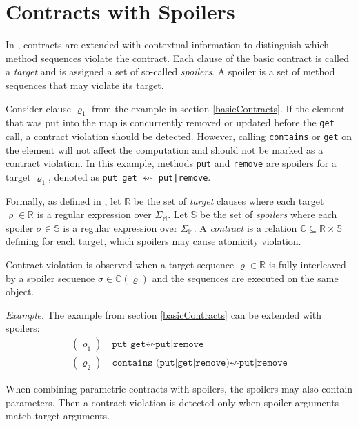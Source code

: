 \section{Contracts with Spoilers}
\label{contractsWithSpoilers}

In \cite{contracts}, contracts are extended with contextual information to
distinguish which method sequences violate the contract. Each clause of the
basic contract is called a \emph{target} and is assigned a set of so-called
\emph{spoilers}. A spoiler is a set of method sequences that may violate its
target.

Consider clause $\varrho_1$ from the example in section \ref{basicContracts}. If
the element that was put into the map is concurrently removed or updated before
the \texttt{get} call, a contract violation should be detected.  However,
calling \texttt{contains} or \texttt{get} on the element will not affect the
computation and should not be marked as a contract violation. In this example,
methods \texttt{put} and \texttt{remove} are spoilers for a target
$\varrho_1$, denoted as \texttt{put get} $\leftsquigarrow$ \texttt{put|remove}.


Formally, as defined in \cite{contracts}, let $\mathbb{R}$ be the set of
\emph{target} clauses where each target $\varrho \in \mathbb{R}$ is a regular
expression over $\Sigma_\mathbb{M}$. Let $\mathbb{S}$ be the set of
\emph{spoilers} where each spoiler $\sigma \in \mathbb{S}$ is a regular
expression over $\Sigma_\mathbb{M}$. A \emph{contract} is a relation $\mathbb{C}
\subseteq \mathbb{R} \times \mathbb{S}$ defining for each target, which spoilers
may cause atomicity violation.

Contract violation is observed when a target sequence $\varrho \in \mathbb{R}$
is fully interleaved by a spoiler sequence $\sigma \in \mathbb{C}(\varrho)$ and
the sequences are executed on the same object.

\emph{Example.} The example from section \ref{basicContracts} can be extended
with spoilers:
\begin{align*}
    (\varrho_1) &\ \texttt{put get} \leftsquigarrow \texttt{put|remove}\\
    (\varrho_2) &\ \texttt{contains (put|get|remove)} \leftsquigarrow
    \texttt{put|remove}
\end{align*}

When combining parametric contracts with spoilers, the spoilers may also contain
parameters. Then a contract violation is detected only when spoiler arguments
match target arguments.

